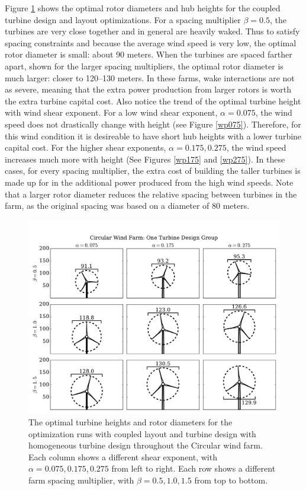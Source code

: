 Figure \ref{circular_turbines_1} shows the optimal rotor diameters and hub heights for the coupled turbine design and layout optimizations. For a spacing multiplier $\beta=0.5$, the turbines are very close together and in general are heavily waked. Thus to satisfy spacing constraints and because the average wind speed is very low, the optimal rotor diameter is small: about 90 meters. When the turbines are spaced farther apart, shown for the larger spacing multipliers, the optimal rotor diameter is much larger: closer to 120--130 meters. In these farms, wake interactions are not as severe, meaning that the extra power production from larger rotors is worth the extra turbine capital cost. Also notice the trend of the optimal turbine height with wind shear exponent. For a low wind shear exponent, $\alpha=0.075$, the wind speed does not drastically change with height (see Figure \ref{wp075}). Therefore, for this wind condition it is desireable to have short hub heights with a lower turbine capital cost. For the higher shear exponents, $\alpha=0.175,0.275$, the wind speed increases much more with height (See Figures \ref{wp175} and \ref{wp275}). In these cases, for every spacing multiplier, the extra cost of building the taller turbines is made up for in the additional power produced from the high wind speeds. Note that a larger rotor diameter reduces the relative spacing between turbines in the farm, as the original spacing was based on a diameter of 80 meters.


\begin{figure}[htbp]
  \centering
  \includegraphics[trim={0.5cm 0.3cm 0.3cm 1.75cm},clip,width=\textwidth]{Figures/turbineSizesCircular_1.pdf}
  \caption{\label{circular_turbines_1} The optimal turbine heights and rotor diameters for the optimization runs with coupled layout and turbine design with homogeneous turbine design throughout the Circular wind farm. Each column shows a different shear exponent, with $\alpha=0.075,0.175,0.275$ from left to right. Each row shows a different farm spacing multiplier, with $\beta=0.5,1.0,1.5$ from top to bottom.}
\end{figure}

